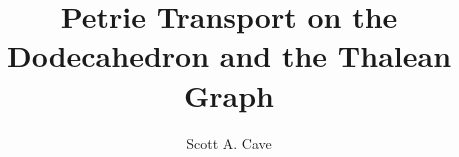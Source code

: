 \title{Petrie Transport on the Dodecahedron and the Thalean Graph}
\author{Scott A. Cave}
\date{}

\maketitle
